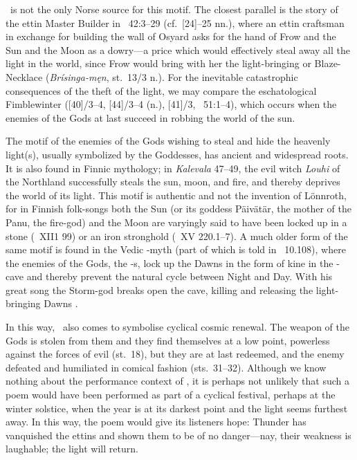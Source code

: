 \Thrymskvida\ is not the only Norse source for this motif.  The closest parallel is the story of the ettin Master Builder in \Gylfaginning~42:3--29 (cf.~[24]--25 nn.), where an ettin craftsman in exchange for building the wall of Osyard asks for the hand of Frow and the Sun and the Moon as a dowry---a price which would effectively steal away all the light in the world, since Frow would bring with her the light-bringing  or Blaze-Necklace (\emph{Brísinga-męn}, st.~13/3 n.).  For the inevitable catastrophic consequences of the theft of the light, we may compare the eschatological Fimblewinter ([40]/3--4, [44]/3--4 (n.), [41]/3, \Gylfaginning~51:1--4), which occurs when the enemies of the Gods at last succeed in robbing the world of the sun.

The motif of the enemies of the Gods wishing to steal and hide the heavenly light(s), usually symbolized by the Goddesses, has ancient and widespread roots.  It is also found in Finnic mythology; in \emph{Kalevala} 47--49, the evil witch \emph{Louhi} of the Northland successfully steals the sun, moon, and fire, and thereby deprives the world of its light.  This motif is authentic and not the invention of Lönnroth, for in Finnish folk-songs both the Sun (or its goddess Päivätär, the mother of the Panu, the fire-god) and the Moon are varyingly said to have been locked up in a stone (\Skvr\ XII1 99) or an iron stronghold (\Skvr\ XV 220.1--7).
A much older form of the same motif is found in the Vedic -myth (part of which is told in \Rigveda\ 10.108), where the enemies of the Gods, the -s, lock up the Dawns in the form of kine in the -cave and thereby prevent the natural cycle between Night and Day.  With his great song the Storm-god  breaks open the cave, killing  and releasing the light-bringing Dawns \parencite[70--71]{JamBrer2020}.

In this way, \Thrymskvida\ also comes to symbolise cyclical cosmic renewal.  The weapon of the Gods is stolen from them and they find themselves at a low point, powerless against the forces of evil (st.~18), but they are at last redeemed, and the enemy defeated and humiliated in comical fashion (sts.~31--32).
Although we know nothing about the performance context of \Thrymskvida, it is perhaps not unlikely that such a poem would have been performed as part of a cyclical festival, perhaps at the winter solstice, when the year is at its darkest point and the light seems furthest away.  In this way, the poem would give its listeners hope: Thunder has vanquished the ettins and shown them to be of no danger---nay, their weakness is laughable; the light will return.

